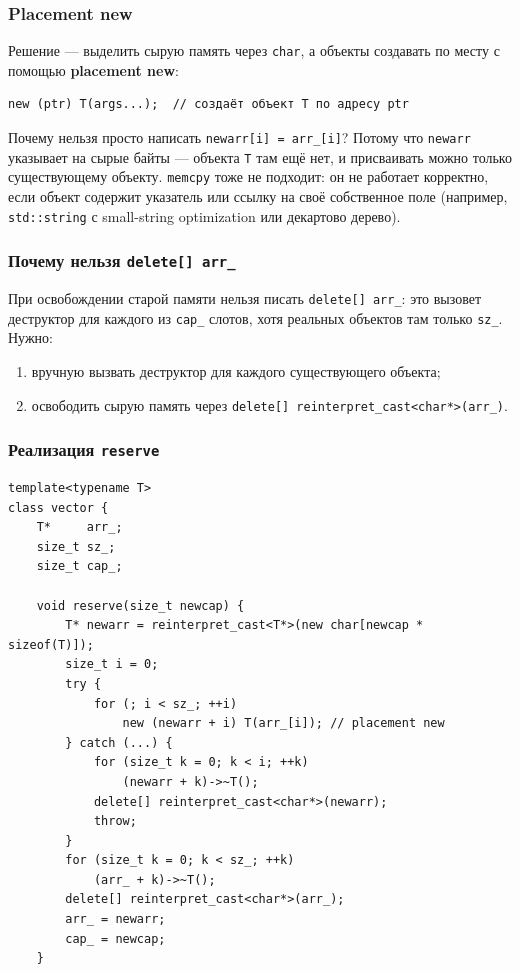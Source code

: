 \documentclass[a4paper,12pt]{article}
\begin{document}
\subsubsection{Placement new}

Решение --- выделить сырую память через \texttt{char}, а объекты
создавать по месту с помощью \textbf{placement new}:

\begin{lstlisting}
new (ptr) T(args...);  // создаёт объект T по адресу ptr
\end{lstlisting}

Почему нельзя просто написать \texttt{newarr[i] = arr\_[i]}?
Потому что \texttt{newarr} указывает на сырые байты --- объекта
\texttt{T} там ещё нет, и присваивать можно только существующему объекту.
\texttt{memcpy} тоже не подходит: он не работает корректно, если объект
содержит указатель или ссылку на своё собственное поле
(например, \texttt{std::string} с small-string optimization или
декартово дерево).

\subsubsection{Почему нельзя \texttt{delete[] arr\_}}

При освобождении старой памяти нельзя писать \texttt{delete[] arr\_}:
это вызовет деструктор для каждого из \texttt{cap\_} слотов, хотя
реальных объектов там только \texttt{sz\_}. Нужно:
\begin{enumerate}
    \item вручную вызвать деструктор для каждого существующего объекта;
    \item освободить сырую память через
          \texttt{delete[] reinterpret\_cast<char*>(arr\_)}.
\end{enumerate}

\subsubsection{Реализация \texttt{reserve}}

\begin{lstlisting}
template<typename T>
class vector {
    T*     arr_;
    size_t sz_;
    size_t cap_;

    void reserve(size_t newcap) {
        T* newarr = reinterpret_cast<T*>(new char[newcap * sizeof(T)]);
        size_t i = 0;
        try {
            for (; i < sz_; ++i)
                new (newarr + i) T(arr_[i]); // placement new
        } catch (...) {
            for (size_t k = 0; k < i; ++k)
                (newarr + k)->~T();
            delete[] reinterpret_cast<char*>(newarr);
            throw;
        }
        for (size_t k = 0; k < sz_; ++k)
            (arr_ + k)->~T();
        delete[] reinterpret_cast<char*>(arr_);
        arr_ = newarr;
        cap_ = newcap;
    }
\end{lstlisting}
\end{document}
